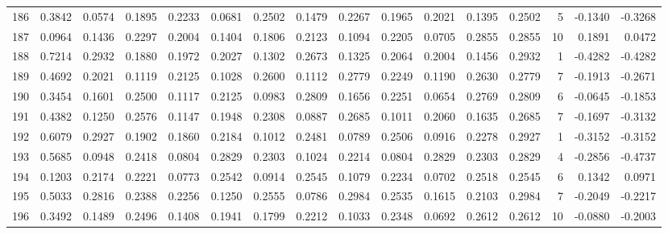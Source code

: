 \begin{tabular}{lrrrrrrrrrrrrrrr}
186 &      0.3842 &  0.0574 &  0.1895 &  0.2233 &  0.0681 &  0.2502 &  0.1479 &  0.2267 &  0.1965 &  0.2021 &   0.1395 &     0.2502 &      5 &                   -0.1340 &                    -0.3268 \\
187 &      0.0964 &  0.1436 &  0.2297 &  0.2004 &  0.1404 &  0.1806 &  0.2123 &  0.1094 &  0.2205 &  0.0705 &   0.2855 &     0.2855 &     10 &                    0.1891 &                     0.0472 \\
188 &      0.7214 &  0.2932 &  0.1880 &  0.1972 &  0.2027 &  0.1302 &  0.2673 &  0.1325 &  0.2064 &  0.2004 &   0.1456 &     0.2932 &      1 &                   -0.4282 &                    -0.4282 \\
189 &      0.4692 &  0.2021 &  0.1119 &  0.2125 &  0.1028 &  0.2600 &  0.1112 &  0.2779 &  0.2249 &  0.1190 &   0.2630 &     0.2779 &      7 &                   -0.1913 &                    -0.2671 \\
190 &      0.3454 &  0.1601 &  0.2500 &  0.1117 &  0.2125 &  0.0983 &  0.2809 &  0.1656 &  0.2251 &  0.0654 &   0.2769 &     0.2809 &      6 &                   -0.0645 &                    -0.1853 \\
191 &      0.4382 &  0.1250 &  0.2576 &  0.1147 &  0.1948 &  0.2308 &  0.0887 &  0.2685 &  0.1011 &  0.2060 &   0.1635 &     0.2685 &      7 &                   -0.1697 &                    -0.3132 \\
192 &      0.6079 &  0.2927 &  0.1902 &  0.1860 &  0.2184 &  0.1012 &  0.2481 &  0.0789 &  0.2506 &  0.0916 &   0.2278 &     0.2927 &      1 &                   -0.3152 &                    -0.3152 \\
193 &      0.5685 &  0.0948 &  0.2418 &  0.0804 &  0.2829 &  0.2303 &  0.1024 &  0.2214 &  0.0804 &  0.2829 &   0.2303 &     0.2829 &      4 &                   -0.2856 &                    -0.4737 \\
194 &      0.1203 &  0.2174 &  0.2221 &  0.0773 &  0.2542 &  0.0914 &  0.2545 &  0.1079 &  0.2234 &  0.0702 &   0.2518 &     0.2545 &      6 &                    0.1342 &                     0.0971 \\
195 &      0.5033 &  0.2816 &  0.2388 &  0.2256 &  0.1250 &  0.2555 &  0.0786 &  0.2984 &  0.2535 &  0.1615 &   0.2103 &     0.2984 &      7 &                   -0.2049 &                    -0.2217 \\
196 &      0.3492 &  0.1489 &  0.2496 &  0.1408 &  0.1941 &  0.1799 &  0.2212 &  0.1033 &  0.2348 &  0.0692 &   0.2612 &     0.2612 &     10 &                   -0.0880 &                    -0.2003 \\

\end{tabular}
